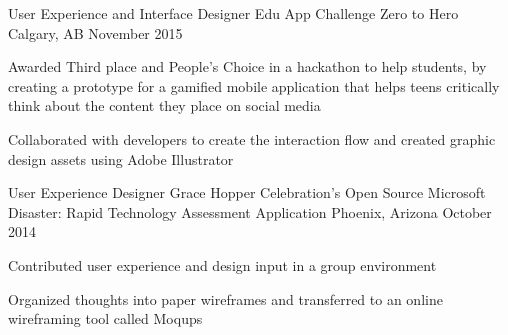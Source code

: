 \begin{cventries}
 \cventry
    {User Experience and Interface Designer}
    {Edu App Challenge Zero to Hero}
    {Calgary, AB}
    {November 2015}
    {
      \begin{cvitems}
        \item {Awarded Third place and People's Choice in a hackathon to help students, by creating a prototype for a gamified mobile application that helps teens critically think about the content they place on social media}
        \item {Collaborated with developers to create the interaction flow and created graphic design assets using Adobe Illustrator}
      \end{cvitems}
    }
  \cventry
    {User Experience Designer}
    {Grace Hopper Celebration's Open Source Microsoft Disaster: Rapid Technology Assessment Application}
    {Phoenix, Arizona}
    {October 2014}
    {
      \begin{cvitems}
        \item {Contributed user experience and design input in a group environment}
        \item {Organized thoughts into paper wireframes and transferred to an online wireframing tool called Moqups}
      \end{cvitems}
    }
\end{cventries}
